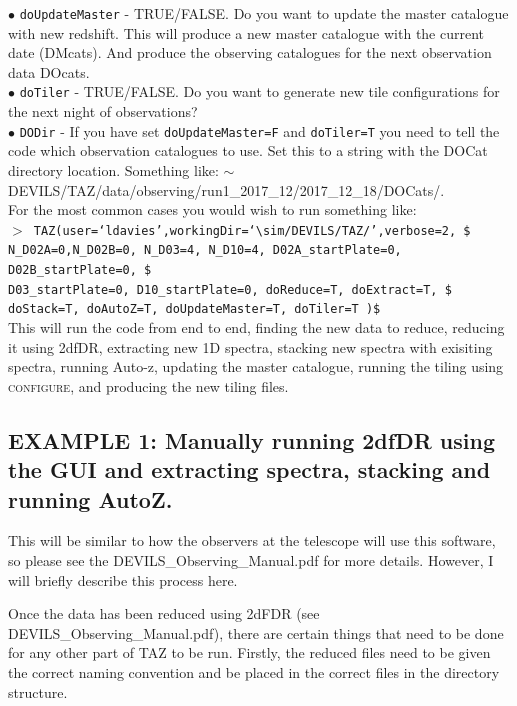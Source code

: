 \documentclass[12pt]{article}
\begin{document}
$\bullet$ \texttt{doUpdateMaster} - TRUE/FALSE. Do you want to update the master catalogue with new redshift. This will produce a new master catalogue with the current date (DMcats). And produce the observing catalogues for the next observation data DOcats. \\ 
$\bullet$ \texttt{doTiler} -  TRUE/FALSE. Do you want to generate new tile configurations for the next night of observations? \\
$\bullet$ \texttt{DODir} - If you have set \texttt{doUpdateMaster=F} and \texttt{doTiler=T} you need to tell the code which observation catalogues to use. Set this to a string with the DOCat directory location. Something like: $\sim$DEVILS/TAZ/data/observing/run1\_2017\_12/2017\_12\_18/DOCats/.\\

For the most common cases you would wish to run something like: \\

\hspace{10mm} \texttt{$>$ TAZ(user=`ldavies',workingDir=`$\sim$/DEVILS/TAZ/',verbose=2, \$ \\
N\_D02A=0,N\_D02B=0, N\_D03=4, N\_D10=4, D02A\_startPlate=0, D02B\_startPlate=0, \$ \\ 
D03\_startPlate=0, D10\_startPlate=0,  doReduce=T, doExtract=T,  \$ \\
doStack=T,  doAutoZ=T, doUpdateMaster=T, doTiler=T )\$ }\\

This will run the code from end to end, finding the new data to reduce, reducing it using 2dfDR, extracting new 1D spectra, stacking new spectra with exisiting spectra, running Auto-z, updating the master catalogue, running the tiling using \textsc{configure}, and producing the new tiling files. 


\subsection{EXAMPLE 1: Manually running 2dfDR using the GUI and extracting spectra, stacking and running AutoZ.}

This will be similar to how the observers at the telescope will use this software, so please see the DEVILS\_Observing\_Manual.pdf for more details. However,  I will briefly describe this process here. 

Once the data has been reduced using 2dFDR (see DEVILS\_Observing\_Manual.pdf), there are certain things that need to be done for any other part of TAZ to be run. Firstly, the reduced files need to be given the correct naming convention and be placed in the correct files in the directory structure.
\end{document}
